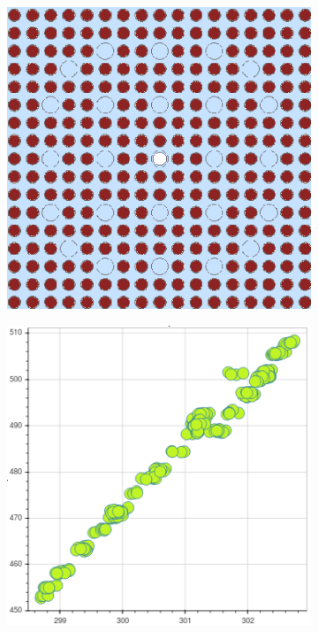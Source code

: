 \begin{figure}[h!]
\centering
\begin{subfigure}{0.45\textwidth}
  \centering
  \includegraphics[width=0.9\linewidth]{figures/unsupervised/features/assm-16/geometry}
  \caption{}
  \label{fig:chap10-fiss-mean-pcm-geom}
\end{subfigure}%
\begin{subfigure}{0.45\textwidth}
  \centering
\includegraphics[width=0.9\linewidth]{figures/unsupervised/features/assm-16/u235-fiss/mean-pcm/mgxs}

\end{subfigure}
\end{figure}
